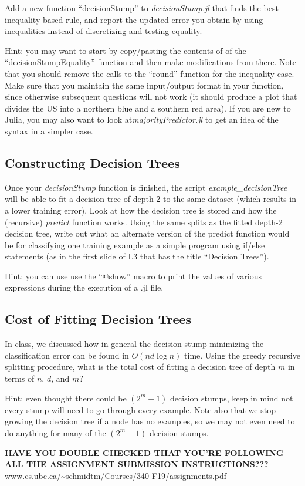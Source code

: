 \documentclass{article}
\def\blu#1{{\color{blu}#1}}
\begin{document}
\blu{Add a new function ``decisionStump'' to \emph{decisionStump.jl} that finds the best inequality-based rule, and report the updated error you obtain by using inequalities instead of discretizing and testing equality.}

Hint: you may want to start by copy/pasting the contents of of the ``decisionStumpEquality'' function and then make modifications from there. Note that you should remove the calls to the ``round'' function for the inequality case.  Make sure that you maintain the same input/output format in your function, since otherwise subsequent questions will not work (it should produce a plot that divides the US into a northern blue and a southern red area).
If you are new to Julia, you may also want to look at\emph{majorityPredictor.jl} to get an idea of the syntax in  a simpler case.

\subsection{Constructing Decision Trees}

Once your \emph{decisionStump} function is finished, the script \emph{example\_decisionTree} will be able to fit a decision tree of depth 2 to the same dataset (which results in a lower training error). Look at how the decision tree is stored and how the (recursive) \emph{predict} function works. \blu{Using the same splits as the fitted depth-2 decision tree, write out what an alternate version of the predict function would be for classifying one training example as a simple program using if/else statements (as in the first slide of L3 that has the title ``Decision Trees'').}

Hint: you can use use the ``@show'' macro to print the values of various expressions during the execution of a .jl file.

\subsection{Cost of Fitting Decision Trees}

In class, we discussed how in general the decision stump minimizing the classification error can be found in $O(nd\log n)$ time. Using the greedy recursive splitting procedure, \blu{what is the total cost of fitting a decision tree of depth $m$ in terms of $n$, $d$, and $m$?} 

Hint: even thought there could be $(2^m-1)$ decision stumps, keep in mind not every stump will need to go through every example. Note also that we stop growing the decision tree if a node has no examples, so we may not even need to do anything for many of the $(2^m-1)$ decision stumps.

\vspace{25pt}
\textbf{HAVE YOU DOUBLE CHECKED THAT YOU'RE FOLLOWING ALL THE ASSIGNMENT SUBMISSION INSTRUCTIONS???}\\
\url{www.cs.ubc.ca/~schmidtm/Courses/340-F19/assignments.pdf}
\end{document}
